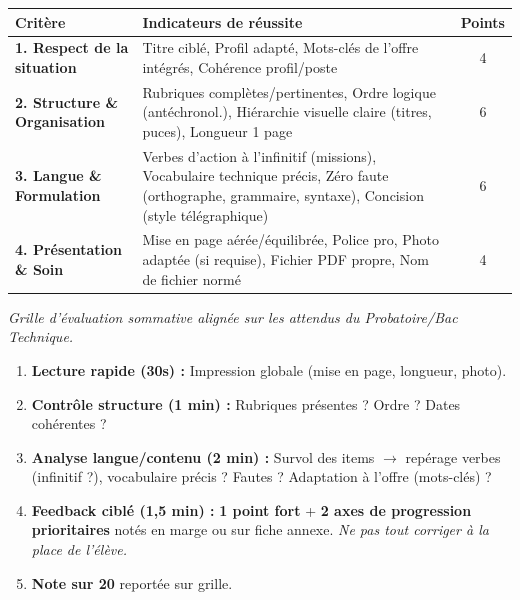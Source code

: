 \documentclass[11pt]{article}
\begin{document}
\begin{exemplebox}
\begin{center}
\begin{tabularx}{\linewidth}{|l|X|c|}\hline
\textbf{Critère} & \textbf{Indicateurs de réussite} & \textbf{Points} \\ \hline
\textbf{1. Respect de la situation} & Titre ciblé, Profil adapté, Mots-clés de l'offre intégrés, Cohérence profil/poste & 4 \\ \hline
\textbf{2. Structure \& Organisation} & Rubriques complètes/pertinentes, Ordre logique (antéchronol.), Hiérarchie visuelle claire (titres, puces), Longueur 1 page & 6 \\ \hline
\textbf{3. Langue \& Formulation} & Verbes d'action à l'infinitif (missions), Vocabulaire technique précis, Zéro faute (orthographe, grammaire, syntaxe), Concision (style télégraphique) & 6 \\ \hline
\textbf{4. Présentation \& Soin} & Mise en page aérée/équilibrée, Police pro, Photo adaptée (si requise), Fichier PDF propre, Nom de fichier normé & 4 \\ \hline
\end{tabularx}
\end{center}
\par\small\textit{Grille d'évaluation sommative alignée sur les attendus du Probatoire/Bac Technique.}\par
\end{exemplebox}

\begin{methode}
\begin{enumerate}
    \item \textbf{Lecture rapide (30s) :} Impression globale (mise en page, longueur, photo).
    \item \textbf{Contrôle structure (1 min) :} Rubriques présentes ? Ordre ? Dates cohérentes ?
    \item \textbf{Analyse langue/contenu (2 min) :} Survol des items $\rightarrow$ repérage verbes (infinitif ?), vocabulaire précis ? Fautes ? Adaptation à l'offre (mots-clés) ?
    \item \textbf{Feedback ciblé (1,5 min) :} \textbf{1 point fort} + \textbf{2 axes de progression prioritaires} notés en marge ou sur fiche annexe. \emph{Ne pas tout corriger à la place de l'élève.}
    \item \textbf{Note sur 20} reportée sur grille.
\end{enumerate}
\end{methode}
\end{document}
